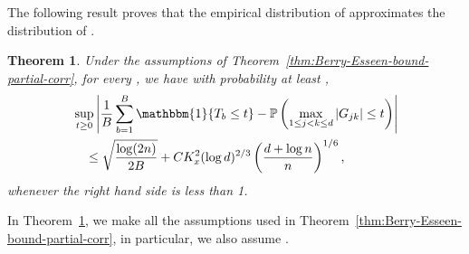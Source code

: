 \documentclass{article}
\newtheorem{theorem}{Theorem}
\begin{document}
The following result proves that the empirical distribution of   approximates the distribution of  .
\begin{theorem}\label{eq:multplier-bootstrap-consistency-partial-corr}
Under the assumptions of Theorem~\ref{thm:Berry-Esseen-bound-partial-corr}, for every  , we have with probability at least  ,
\begin{align*}
&\sup_{t\ge0}\left|\frac{1}{B}\sum_{b=1}^B \mathbbm{1}\{T_b \le t\} - \mathbb{P}\left(\max_{1\le j < k\le d}|G_{jk}| \le t\right)\right|\\ &\quad\le \sqrt{\frac{\log(2n)}{2B}} + CK_x^{2}(\log d)^{{2}/{3}}\left(\frac{d + \log n}{n}\right)^{{1}/{6}},
\end{align*}
whenever the right hand side is less than 1.
\end{theorem}
In Theorem~\ref{eq:multplier-bootstrap-consistency-partial-corr}, we make all the assumptions used in Theorem~\ref{thm:Berry-Esseen-bound-partial-corr}, in particular, we also assume  .
\end{document}
